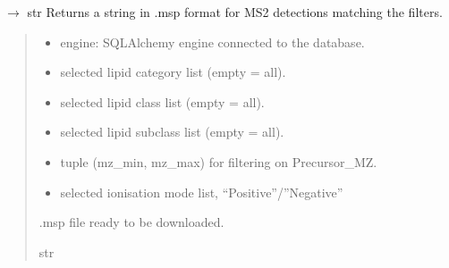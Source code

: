 \documentclass[letterpaper,10pt,english]{sphinxmanual}
\begin{document}
\begin{fulllineitems}
\label{\detokenize{api:utils.msp_export.generate_msp}}
\pysigstartsignatures
\pysiglinewithargsret
{}
{\sphinxparamcomma {}\sphinxparamcomma {}\sphinxparamcomma {}\sphinxparamcomma {}\sphinxparamcomma {}}
{{ $\rightarrow$ str}}
\pysigstopsignatures
\sphinxAtStartPar
Returns a string in .msp format for MS2 detections matching the filters.
\begin{quote}\begin{description}
\begin{itemize}
\item {} 
\sphinxAtStartPar
{} \textendash{} engine: SQLAlchemy engine connected to the database.

\item {} 
\sphinxAtStartPar
{} \textendash{} selected lipid category list (empty = all).

\item {} 
\sphinxAtStartPar
{} \textendash{} selected lipid class list (empty = all).

\item {} 
\sphinxAtStartPar
{} \textendash{} selected lipid subclass list (empty = all).

\item {} 
\sphinxAtStartPar
{} \textendash{} tuple (mz\_min, mz\_max) for filtering on Precursor\_MZ.

\item {} 
\sphinxAtStartPar
{} \textendash{} selected ionisation mode list, “Positive”/”Negative”

\end{itemize}

\sphinxAtStartPar
.msp file ready to be downloaded.

\sphinxAtStartPar
str

\end{description}\end{quote}

\end{fulllineitems}
\end{document}
